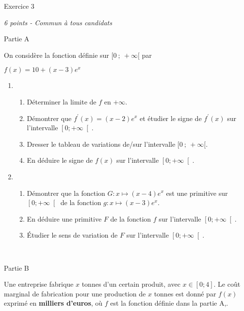 
%
\begin{h2}Exercice 3\end{h2}
\textit{6 points - Commun à tous candidats }
\begin{h3}Partie A\end{h3}
On considère la fonction définie sur $ [ 0~;~+\infty [ $ par

\begin{center}
$f\left(x\right)= 10+\left(x-3\right)e^{x}$
\end{center}

\begin{enumerate}
     \item
     \begin{enumerate}[label=\alph*.]
          \item
          Déterminer la limite de $f$ en $+ \infty $.
          \item
          Démontrer que $f^{\prime}\left(x\right)=\left(x-2\right)e^{x}$ et étudier le signe de $f^{\prime}\left(x\right)$ sur l'intervalle $\left[0  ; +\infty \right[$.
          \item
          Dresser le tableau de variations de/sur l'intervalle $ [ 0~;~+\infty [ $.
          \item
          En déduire le signe de $f\left(x\right)$ sur l'intervalle $\left[0  ; +\infty \right[$.
     \end{enumerate}
     \item
     \begin{enumerate}[label=\alph*.]
          \item
          Démontrer que la fonction $G : x \mapsto   \left(x-4 \right)e^{x}$ est une primitive sur $\left[0  ; +\infty \right[$ de la fonction $g : x \mapsto  \left(x-3 \right)e^{x}$.
          \item
          En déduire une primitive $F$ de la fonction $f$ sur l'intervalle $\left[0  ; +\infty \right[$.
          \item
          Étudier le sens de variation de $F$ sur l'intervalle $\left[0  ; +\infty \right[$.
     \end{enumerate}
\end{enumerate}
 
\begin{h3}Partie B\end{h3}
Une entreprise fabrique $x$ tonnes d'un certain produit, avec $x\in \left[0  ; 4\right]$. Le coût marginal de fabrication pour une production de $x$ tonnes est donné par $f\left(x\right)$ exprimé en \textbf{milliers d'euros}, où $f$ est la fonction définie dans la partie A,.
